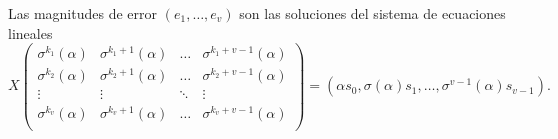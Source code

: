 \begin{proposition}
  \label{prop:pgz-sesgados-magnitudes-error}
  Las magnitudes de error \((e_{1}, \dots, e_{v})\) son las soluciones del sistema de ecuaciones lineales
  \[
    X \begin{pmatrix}
     \sigma^{k_1}(\alpha) & \sigma^{k_1 + 1}(\alpha) & \dots & \sigma^{k_1 + v - 1}(\alpha)\\ 
     \sigma^{k_2}(\alpha) & \sigma^{k_2 + 1}(\alpha) & \dots & \sigma^{k_2 + v - 1}(\alpha)\\ 
     \vdots & \vdots & \ddots & \vdots\\ 
     \sigma^{k_v}(\alpha) & \sigma^{k_v + 1}(\alpha) & \dots & \sigma^{k_v + v - 1}(\alpha)\\ 
    \end{pmatrix}
    = (\alpha s_0, \sigma(\alpha)s_1, \dots, \sigma^{v-1}(\alpha)s_{v-1}).
  \]
\end{proposition}

